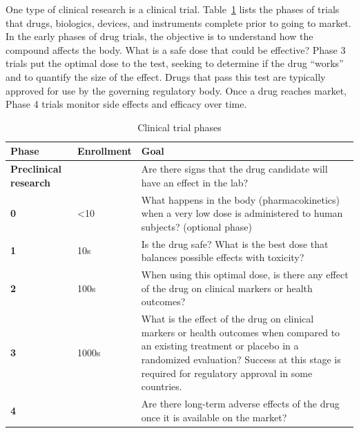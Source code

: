 \documentclass[
  letterpaper,
  DIV=11,
  numbers=noendperiod,
  oneside]{scrreprt}
\begin{document}
One type of clinical research is a clinical trial.
Table~\ref{tbl-phases} lists the phases of trials that drugs, biologics,
devices, and instruments complete prior to going to market. In the early
phases of drug trials, the objective is to understand how the compound
affects the body. What is a safe dose that could be effective? Phase 3
trials put the optimal dose to the test, seeking to determine if the
drug ``works'' and to quantify the size of the effect. Drugs that pass
this test are typically approved for use by the governing regulatory
body. Once a drug reaches market, Phase 4 trials monitor side effects
and efficacy over time.

\vspace{1em}

\hypertarget{tbl-phases}{}
\begin{table}

\caption{\label{tbl-phases}Clinical trial phases }
\begin{tabular}[t]{>{\raggedright\arraybackslash}p{3.5cm}l>{\raggedright\arraybackslash}p{10cm}}
\toprule
\textbf{Phase} & \textbf{Enrollment} & \textbf{Goal}\\
\midrule
\textbf{Preclinical research} &  & Are there signs that the drug candidate will have an effect in the lab?\\
\textbf{0} & <10 & What happens in the body (pharmacokinetics) when a very low dose is administered to human subjects? (optional phase)\\
\textbf{1} & 10s & Is the drug safe? What is the best dose that balances possible effects with toxicity?\\
\textbf{2} & 100s & When using this optimal dose, is there any effect of the drug on clinical markers or health outcomes?\\
\textbf{3} & 1000s & What is the effect of the drug on clinical markers or health outcomes when compared to an existing treatment or placebo in a randomized evaluation? Success at this stage is required for regulatory approval in some countries.\\
\addlinespace
\textbf{4} &  & Are there long-term adverse effects of the drug once it is available on the market?\\
\bottomrule
\end{tabular}
\end{table}

\vspace{2em}

\end{document}

